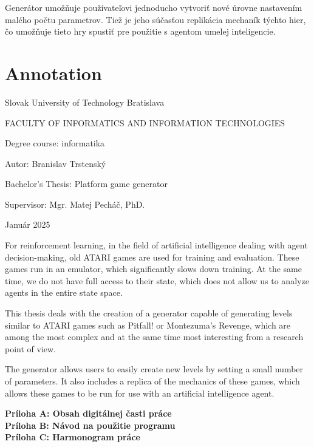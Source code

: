 Generátor umožňuje používateľovi jednoducho vytvoriť nové úrovne nastavením malého počtu parametrov. Tiež je jeho súčasťou replikácia mechaník týchto hier, čo umožňuje tieto hry spustiť pre použitie s agentom umelej inteligencie.

\newpage

\null \thispagestyle{empty}

\newpage

\section*{Annotation}

Slovak University of Technology Bratislava

FACULTY OF INFORMATICS AND INFORMATION TECHNOLOGIES


Degree course: \tab informatika

Autor: \tab Branislav Trstenský

Bachelor's Thesis: \tab Platform game generator

Supervisor: \tab Mgr. Matej Pecháč, PhD.

Január 2025

For reinforcement learning, in the field of artificial intelligence dealing with agent decision-making, old ATARI games are used for training and evaluation. These games run in an emulator, which significantly slows down training. At the same time, we do not have full access to their state, which does not allow us to analyze agents in the entire state space.

This thesis deals with the creation of a generator capable of generating levels similar to ATARI games such as Pitfall! or Montezuma's Revenge, which are among the most complex and at the same time most interesting from a research point of view.

The generator allows users to easily create new levels by setting a small number of parameters. It also includes a replica of the mechanics of these games, which allows these games to be run for use with an artificial intelligence agent.

\newpage

\null \thispagestyle{empty}

\newpage

\thispagestyle{plain}
\tableofcontents

\textbf{Príloha A: Obsah digitálnej časti práce} \\
\textbf{Príloha B: Návod na použitie programu} \\
\textbf{Príloha C: Harmonogram práce}

